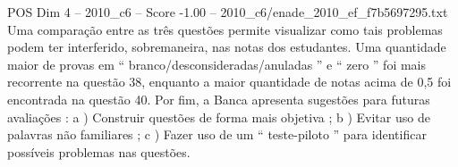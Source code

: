 \begin{textsample}{POS Dim 4 – 2010\_c6 – Score -1.00 – 2010\_c6/enade\_2010\_ef\_f7b5697295.txt}
Uma comparação entre as três questões permite visualizar como tais problemas podem ter interferido, sobremaneira, nas notas dos estudantes.
Uma quantidade maior de provas em “ branco/desconsideradas/anuladas ” e “ zero ” foi mais recorrente na questão 38, enquanto a maior quantidade de notas acima de 0,5 foi encontrada na questão 40.
Por fim, a Banca apresenta sugestões para futuras avaliações : a ) Construir questões de forma mais objetiva ; b ) Evitar uso de palavras não familiares ; c ) Fazer uso de um “ teste-piloto ” para identificar possíveis problemas nas questões.

\end{textsample}
